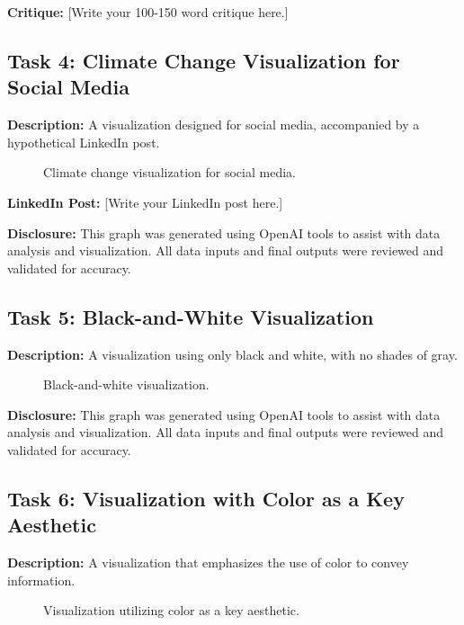 \documentclass[a4paper,landscape]{article}
\begin{document}
\textbf{Critique:}
[Write your 100-150 word critique here.]

\subsection{Task 4: Climate Change Visualization for Social Media}
\textbf{Description:} A visualization designed for social media, accompanied by a hypothetical LinkedIn post.

\begin{figure}[H]
    \centering
    \caption{Climate change visualization for social media.}
    \label{fig:climate}
\end{figure}

\textbf{LinkedIn Post:}
[Write your LinkedIn post here.]

\textbf{Disclosure:} This graph was generated using OpenAI tools to assist with data analysis and visualization. All data inputs and final outputs were reviewed and validated for accuracy.

\subsection{Task 5: Black-and-White Visualization}
\textbf{Description:} A visualization using only black and white, with no shades of gray.

\begin{figure}[H]
    \centering
    \caption{Black-and-white visualization.}
    \label{fig:bw}
\end{figure}

\textbf{Disclosure:} This graph was generated using OpenAI tools to assist with data analysis and visualization. All data inputs and final outputs were reviewed and validated for accuracy.

\subsection{Task 6: Visualization with Color as a Key Aesthetic}
\textbf{Description:} A visualization that emphasizes the use of color to convey information.

\begin{figure}[H]
    \centering
    \caption{Visualization utilizing color as a key aesthetic.}
    \label{fig:color}
\end{figure}
\end{document}
